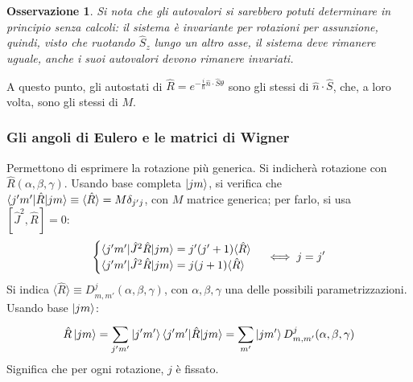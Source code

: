 \documentclass[11pt, a4paper]{scrartcl} %
\numberwithin{equation}{subsection}
\theoremstyle{style2}
\newtheorem{osservazione}{Osservazione}[section]
\theoremstyle{style1}
\begin{document}
\begin{osservazione}
Si nota che gli autovalori si sarebbero potuti determinare in principio senza calcoli: il sistema \`e invariante per rotazioni per assunzione, quindi, visto che ruotando $\hat{S}_z$ lungo un altro asse, il sistema deve rimanere uguale, anche i suoi autovalori devono rimanere invariati.
\end{osservazione}
A questo punto, gli autostati di $\hat{R} = e^{- \frac{i}{\hbar }\hat{n}\cdot \hat{S}\theta } $ sono gli stessi di $\hat{n}\cdot \hat{S}$, che, a loro volta, sono gli stessi di $M$.

\subsubsection{Gli angoli di Eulero e le matrici di Wigner}
Permettono di esprimere la rotazione pi\`u generica. Si indicher\`a rotazione con $\hat{R}(\alpha ,\beta ,\gamma)$. Usando base completa $\ket{jm} $, si verifica che $\braket{j'm'|\hat{R}|jm} \equiv \langle \hat{R} \rangle= M\delta _{j'j} $, con $M$ matrice generica; per farlo, si usa $[\hat{J}^2 , \hat{R}] = 0$:
\[
\begin{cases}
	\braket{j'm'|\hat{J}^2 \hat{R}|jm}  = j' (j'+1) \langle \hat{R} \rangle\\
	\braket{j'm'|\hat{J}^2 \hat{R}|jm} = j(j+1) \langle \hat{R} \rangle
\end{cases} \iff j = j'
\] 
Si indica $\langle \hat{R} \rangle\equiv D^j _{m , m'} (\alpha ,\beta ,\gamma)$, con $\alpha ,\beta ,\gamma$ una delle possibili parametrizzazioni. Usando base $\ket{jm} $:
\[
\hat{R} \ket{jm}  = \sum_{j'm'}^{} \ket{j'm'} \braket{j'm'|\hat{R}|jm} = \sum_{m'}^{} \ket{jm'} D_{m,m'} ^j (\alpha ,\beta ,\gamma)
\] 
Significa che per ogni rotazione, $j$ \`e fissato. 
\end{document}
